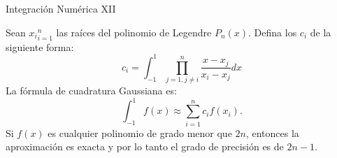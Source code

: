\begin{frame}{Integración Numérica XII}
\begin{Def}
Sean ${x_i}_{i=1}^{n}$ las raíces del polinomio de Legendre $P_n(x)$. Defina los $c_i$ de la siguiente forma:
$$c_i=\int_{-1}^{1}\prod _{j=1,j\neq i}^{n}\dfrac{x-x_j}{x_i-x_j}dx$$
La fórmula de cuadratura Gaussiana es:
$$\int_{-1}^{1}f(x)\approx\sum_{i=1}^{n}c_if(x_i).$$
Si $f(x)$ es cualquier polinomio de grado menor que $2n$, entonces la aproximación es exacta y por lo tanto el grado de precisión es de $2n-1$.
\end{Def}
\end{frame}
